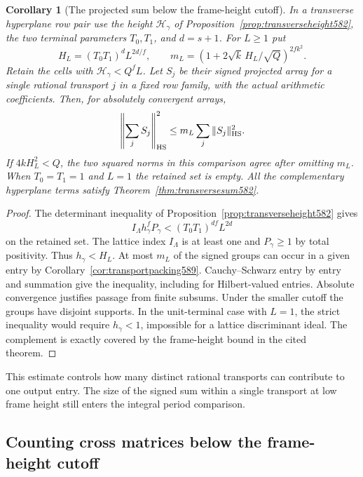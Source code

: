 \documentclass[a4paper,11pt]{article}
\newtheorem{corollary}[proposition]{Corollary}
\theoremstyle{definition}
\theoremstyle{remark}
\numberwithin{equation}{section}
\begin{document}
\begin{corollary}[The projected sum below the frame-height cutoff]
\leavevmode\label{cor:smalltransverse589}
In a transverse hyperplane row pair use the height
\(\mathcal H_\gamma\) of Proposition~\ref{prop:transverseheight582},
the two terminal parameters \(T_0,T_1\), and \(d=s+1\).
For \(L\ge1\) put
\[
        H_L=(T_0T_1)^d L^{2d/f},\qquad
        m_L=(1+2\sqrt{k}\,H_L/\sqrt Q)^{2fk^2}.
\]
Retain the cells with \(\mathcal H_\gamma<Q^fL\).
Let \(S_j\) be their signed projected array for a single
rational transport \(j\) in a fixed row family, with the
actual arithmetic coefficients. Then, for absolutely
convergent arrays,
\[
          \left\|\sum_j S_j\right\|_{\rm HS}^2
                     \le m_L\sum_j\|S_j\|_{\rm HS}^2 .
\]
If \(4kH_L^2<Q\), the two squared norms in this comparison
agree after omitting \(m_L\). When \(T_0=T_1=1\) and \(L=1\)
the retained set is empty. All the complementary hyperplane
terms satisfy Theorem~\ref{thm:transversesum582}.
\end{corollary}
\begin{proof}
The determinant inequality of Proposition~\ref{prop:transverseheight582}
gives
\[
       I_\Lambda h_\gamma^f P_\gamma
                            < (T_0T_1)^{df}L^{2d}
\]
on the retained set. The lattice index \(I_\Lambda\) is at
least one and \(P_\gamma\ge1\) by total positivity. Thus
\(h_\gamma<H_L\). At most \(m_L\) of the signed groups can
occur in a given entry by Corollary~\ref{cor:transportpacking589}.
Cauchy--Schwarz entry by entry and summation give the
inequality, including for Hilbert-valued entries. Absolute
convergence justifies passage from finite subsums. Under the
smaller cutoff the groups have disjoint supports. In the
unit-terminal case with \(L=1\), the strict inequality
would require \(h_\gamma<1\), impossible for a lattice
discriminant ideal. The complement is exactly covered by
the frame-height bound in the cited theorem.
\end{proof}

This estimate controls how many distinct rational transports
can contribute to one output entry. The size of the signed
sum within a single transport at low frame height still
enters the integral period comparison.


\subsection{Counting cross matrices below the frame-height cutoff}
\label{sec:smallframes590}
\end{document}
